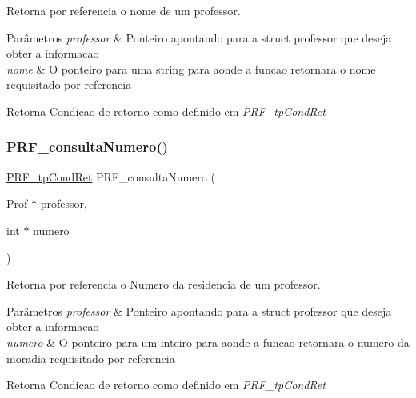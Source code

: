 Retorna por referencia o nome de um professor. 


\begin{DoxyParams}{Parâmetros}
{\em professor} & Ponteiro apontando para a struct professor que deseja obter a informacao \\
\hline
{\em nome} & O ponteiro para uma string para aonde a funcao retornara o nome requisitado por referencia \\
\hline
\end{DoxyParams}
\begin{DoxyReturn}{Retorna}
Condicao de retorno como definido em {\itshape P\+R\+F\+\_\+tp\+Cond\+Ret} 
\end{DoxyReturn}
\mbox{\label{group__funcoes_consulta_gae4861c93c873d1372539f5914cd11625}} 
\subsubsection{\texorpdfstring{P\+R\+F\+\_\+consulta\+Numero()}{PRF\_consultaNumero()}}
{\footnotesize\ttfamily \hyperlink{group__modulo_professor_ga777e215896d573d2e99d98793b1f0ed1}{P\+R\+F\+\_\+tp\+Cond\+Ret} P\+R\+F\+\_\+consulta\+Numero (\begin{DoxyParamCaption}\item[{\hyperlink{structprof}{Prof} $\ast$}]{professor,  }\item[{int $\ast$}]{numero }\end{DoxyParamCaption})}



Retorna por referencia o Numero da residencia de um professor. 


\begin{DoxyParams}{Parâmetros}
{\em professor} & Ponteiro apontando para a struct professor que deseja obter a informacao \\
\hline
{\em numero} & O ponteiro para um inteiro para aonde a funcao retornara o numero da moradia requisitado por referencia \\
\hline
\end{DoxyParams}
\begin{DoxyReturn}{Retorna}
Condicao de retorno como definido em {\itshape P\+R\+F\+\_\+tp\+Cond\+Ret} 
\end{DoxyReturn}
\mbox{\label{group__funcoes_consulta_ga330d3968561d75935ce224251cc656b8}} 
